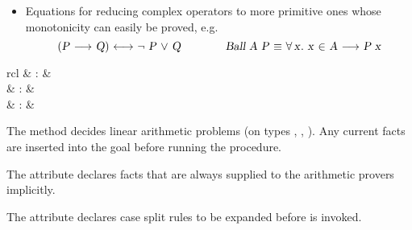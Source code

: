 \begin{isabellebody}
\begin{isamarkuptext}
\begin{itemize}
  \item Equations for reducing complex operators to more primitive
  ones whose monotonicity can easily be proved, e.g.
  \[
  \isa{{\isaliteral{22}{\isachardoublequote}}{\isaliteral{28}{\isacharparenleft}}P\ {\isaliteral{5C3C6C6F6E6772696768746172726F773E}{\isasymlongrightarrow}}\ Q{\isaliteral{29}{\isacharparenright}}\ {\isaliteral{5C3C6C6F6E676C65667472696768746172726F773E}{\isasymlongleftrightarrow}}\ {\isaliteral{5C3C6E6F743E}{\isasymnot}}\ P\ {\isaliteral{5C3C6F723E}{\isasymor}}\ Q{\isaliteral{22}{\isachardoublequote}}} \qquad\qquad
  \isa{{\isaliteral{22}{\isachardoublequote}}Ball\ A\ P\ {\isaliteral{5C3C65717569763E}{\isasymequiv}}\ {\isaliteral{5C3C666F72616C6C3E}{\isasymforall}}x{\isaliteral{2E}{\isachardot}}\ x\ {\isaliteral{5C3C696E3E}{\isasymin}}\ A\ {\isaliteral{5C3C6C6F6E6772696768746172726F773E}{\isasymlongrightarrow}}\ P\ x{\isaliteral{22}{\isachardoublequote}}}
  \]

  \end{itemize}

\end{isamarkuptext}%
\isamarkuptrue%
%
\isamarkuptrue%
%
\begin{isamarkuptext}%
\begin{matharray}{rcl}
    \hypertarget{method.HOL.arith}{\hyperlink{method.HOL.arith}{\mbox{}}} & : &  \\
    \hypertarget{attribute.HOL.arith}{\hyperlink{attribute.HOL.arith}{\mbox{}}} & : &  \\
    \hypertarget{attribute.HOL.arith-split}{\hyperlink{attribute.HOL.arith-split}{\mbox{}}} & : &  \\
  \end{matharray}

  The \hyperlink{method.HOL.arith}{\mbox{}} method decides linear arithmetic problems
  (on types , , ).  Any current
  facts are inserted into the goal before running the procedure.

  The \hyperlink{attribute.HOL.arith}{\mbox{}} attribute declares facts that are
  always supplied to the arithmetic provers implicitly.

  The \hyperlink{attribute.HOL.arith-split}{\mbox{}} attribute declares case split
  rules to be expanded before \hyperlink{method.HOL.arith}{\mbox{}} is invoked.


\end{isamarkuptext}
\end{isabellebody}
